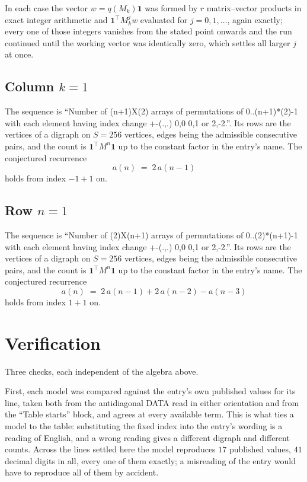 \documentclass[11pt,a4paper]{article}
\theoremstyle{plain}
\theoremstyle{definition}
\begin{document}
In each case the vector $w=q(M_k)\mathbf{1}$ was formed by $r$ matrix--vector products in
exact integer arithmetic and $\mathbf{1}^{\!\top}M_k^{j}w$ evaluated for $j=0,1,\dots$,
again exactly; every one of those integers vanishes from the stated point onwards and the run
continued until the working vector was identically zero, which settles all larger $j$ at once.

\subsection*{Column $k$$=1$}
The sequence is ``Number of (n+1)X(2) arrays of permutations of 0..(n+1)*(2)-1 with each element having index change +-(.,.) 0,0 0,1 or 2,-2.''. Its rows are the vertices of a digraph on
$S=256$ vertices, edges being the admissible consecutive pairs, and the count is
$\mathbf{1}^{\!\top}M^{n}\mathbf{1}$ up to the constant factor in the entry's name.
The conjectured recurrence
\[
a(n)\;=\;2\,a(n-1)
\]
holds from index $-1+1$ on.

\subsection*{Row $n$$=1$}
The sequence is ``Number of (2)X(n+1) arrays of permutations of 0..(2)*(n+1)-1 with each element having index change +-(.,.) 0,0 0,1 or 2,-2.''. Its rows are the vertices of a digraph on
$S=256$ vertices, edges being the admissible consecutive pairs, and the count is
$\mathbf{1}^{\!\top}M^{n}\mathbf{1}$ up to the constant factor in the entry's name.
The conjectured recurrence
\[
a(n)\;=\;2\,a(n-1) + 2\,a(n-2) - a(n-3)
\]
holds from index $1+1$ on.

\section{Verification}

Three checks, each independent of the algebra above.

First, each model was compared against the entry's own published values for its line, taken
both from the antidiagonal DATA read in either orientation and from the ``Table starts''
block, and agrees at every available term. This is what ties a model to the table:
substituting the fixed index into the entry's wording is a reading of English, and a wrong
reading gives a different digraph and different counts. Across the lines settled here the
model reproduces $17$ published values, $41$ decimal digits in all, every one of
them exactly; a misreading of the entry would have to reproduce all of them by accident.
\end{document}

